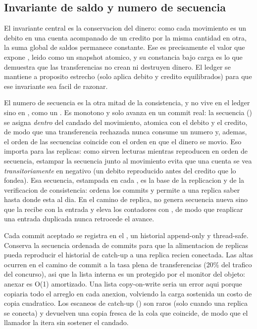 \subsection{Invariante de saldo y numero de secuencia}

El invariante central es la conservacion del dinero: como cada movimiento es un
debito en una cuenta acompanado de un credito por la misma cantidad en otra, la
suma global de saldos permanece constante. Ese es precisamente el valor que
expone , leido como un snapshot atomico, y su
constancia bajo carga es lo que demuestra que las transferencias no crean ni
destruyen dinero. El ledger se
mantiene a proposito estrecho (solo aplica debito y credito equilibrados) para
que ese invariante sea facil de razonar.

El numero de secuencia es la otra mitad de la consistencia, y no vive en el
ledger sino en , como un . Es
monotono y solo avanza en un commit real: la secuencia
() se asigna \emph{dentro} del candado del
movimiento, atomica con el debito y el credito, de modo que una transferencia
rechazada nunca consume un numero y, ademas, el orden de las secuencias coincide
con el orden en que el dinero se movio. Eso importa para las replicas: como sirven
lecturas mientras reproducen en orden de secuencia, estampar la secuencia junto al
movimiento evita que una cuenta se vea \emph{transitoriamente} en negativo (un
debito reproducido antes del credito que lo fondea). Esa secuencia, estampada en
cada , es la base de la replicacion y de la verificacion de
consistencia: ordena los commits y permite a una replica saber hasta donde esta al
dia. En el camino de replica,
 no genera secuencia nueva sino que la
recibe con la entrada y eleva los contadores con
, de modo que reaplicar una entrada
duplicada nunca retrocede el avance.

Cada commit aceptado se registra en el , un
historial append-only y thread-safe. Conserva la secuencia ordenada de commits
para que la alimentacion de replicas pueda reproducir el historial de catch-up a
una replica recien conectada. Las altas ocurren en el camino de commit a la tasa
plena de transferencias (20\% del trafico del concurso), asi que la lista interna
es un  protegido por el monitor del objeto: anexar es O(1)
amortizado. Una lista copy-on-write seria un error aqui porque copiaria todo el
arreglo en cada anexion, volviendo la carga sostenida un costo de copia
cuadratico. Los escaneos de catch-up () son raros (solo cuando una
replica se conecta) y devuelven una copia fresca de la cola que coincide, de modo
que el llamador la itera sin sostener el candado.

